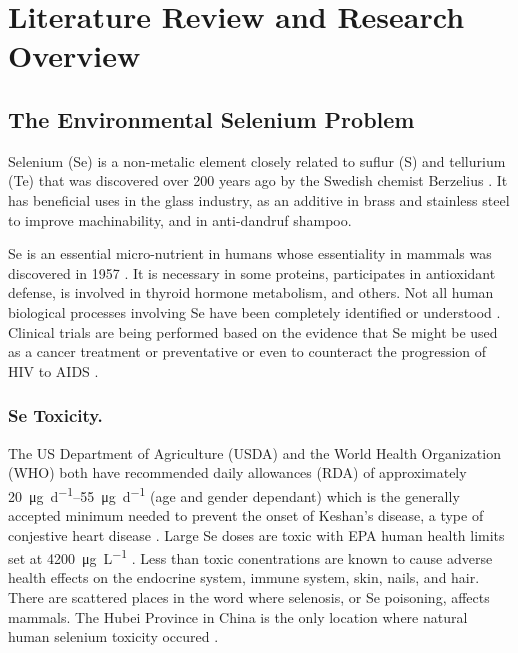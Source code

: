\chapter{Literature Review and Research Overview}
\label{chap:litreview}

\begin{linenumbers}[1]

\section{The Environmental Selenium Problem}
\label{sec:the selenium problem}

Selenium (Se) is a non-metalic element closely related to suflur (S) and tellurium (Te) that was discovered over 200 years ago by the Swedish chemist Berzelius \citep{scott1973}.  It has beneficial uses in the glass industry, as an additive in brass and stainless steel to improve machinability, and in anti-dandruf shampoo.  

Se is an essential micro-nutrient in humans whose essentiality in mammals was discovered in 1957 \citep{schwarz1957}.   It is necessary in some proteins, participates in antioxidant defense, is involved in thyroid hormone metabolism, and others.  Not all human biological processes involving Se have been completely identified or understood \citep{rayman2000,navarro2000,roman2014}.  Clinical trials are being performed based on the evidence that Se might be used as a cancer treatment or preventative or even to counteract the progression of HIV to AIDS \citep{rayman2000,roman2014}.

\subsection*{Se Toxicity.}
The US Department of Agriculture (USDA) and the World Health Organization (WHO) both have recommended daily allowances (RDA) of approximately \SIrange{20}{55}{\micro\gram\per\day} (age and gender dependant) which is the generally accepted minimum needed to prevent the onset of Keshan's disease, a type of conjestive heart disease \citep{world1996,USDA2010}.  Large Se doses are toxic \citep{roman2014,navarro2000} with EPA human health limits set at \SI{4200}{\micro\gram\per\liter} \citep{EPA-Se}.  Less than toxic conentrations are known to cause adverse health effects on the endocrine system, immune system, skin, nails, and hair.  There are scattered places in the word where selenosis, or Se poisoning, affects mammals.  The Hubei Province in China is the only location where natural human selenium toxicity occured \citep{2002Spallholz}.


\end{linenumbers}
